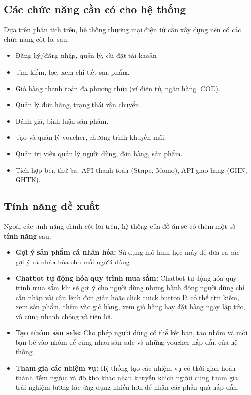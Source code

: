 \documentclass[../DoAn.tex]{subfiles}
\begin{document}
\subsection{Các chức năng cần có cho hệ thống}
\label{subsection:2.1.2}
Dựa trên phân tích trên, hệ thống thương mại điện tử cần xây dựng nên có các chức năng cốt lõi sau:

\begin{itemize}
  \item Đăng ký/đăng nhập, quản lý, cài đặt tài khoản
  \item Tìm kiếm, lọc, xem chi tiết sản phẩm.
  \item Giỏ hàng thanh toán đa phương thức (ví điện tử, ngân hàng, COD).
  \item Quản lý đơn hàng, trạng thái vận chuyển.
  \item Đánh giá, bình luận sản phẩm.
  \item Tạo và quản lý voucher, chương trình khuyến mãi.
  \item Quản trị viên quản lý người dùng, đơn hàng, sản phẩm.
  \item Tích hợp bên thứ ba: API thanh toán (Stripe, Momo), API giao hàng (GHN, GHTK).
\end{itemize}

\subsection{Tính năng đề xuất}
\label{subsection:2.1.3}
Ngoài các tính năng chính cốt lõi trên, hệ thống của đồ án sẽ có thêm một số \textbf{tính năng} sau:

\begin{itemize}
  \item \textbf{Gợi ý sản phẩm cá nhân hóa:} Sử dụng mô hình học máy để đưa ra các gợi ý cá nhân hóa cho mỗi người dùng
  \item \textbf{Chatbot tự động hóa quy trình mua sắm:} Chatbot tự động hóa quy trình mua sắm khi sẽ gợi ý cho người dùng những hành động người dùng chỉ cần nhập vài câu lệnh đơn giản hoặc click quick button là có thể tìm kiếm, xem sản phẩm, thêm vào giỏ hàng, xem giỏ hàng hay đặt hàng ngay lập tức, vô cùng nhanh chóng và tiện lợi.
  \item \textbf{Tạo nhóm săn sale:} Cho phép người dùng có thể kết bạn, tạo nhóm và mời bạn bè vào nhóm để cùng nhau săn sale và những voucher hấp dẫn của hệ thống
  \item \textbf{Tham gia các nhiệm vụ:} Hệ thống tạo các nhiệm vụ có thời gian hoàn thành đếm ngược và độ khó khác nhau khuyến khích người dùng tham gia trải nghiệm tương tác ứng dụng nhiều hơn để nhận các phần quà hấp dẫn.
\end{itemize}
\end{document}
